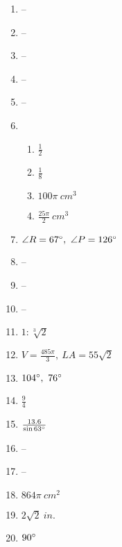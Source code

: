 \documentclass{article}
\begin{document}
\begin{enumerate}
\item -- 

\item --

\item --

\item --

\item --

\item 

	\begin{enumerate}
	
	\item $\frac{1}{2}$
	
	\item $\frac{1}{8}$
	
	\item $100 \pi \ cm^3$
	
	\item $\frac{25 \pi}{2} \ cm^3$
	
	\end{enumerate}
	
\item $\angle R = 67 \degree, \ \angle P = 126 \degree$

\item --

\item --

\item --

\item $1 : \sqrt[3]{2}$

\item $V = \frac{485 \pi}{3}, \ LA = 55 \sqrt{2}$

\item $104 \degree, \ 76 \degree$

\item $\frac{9}{4}$

\item $\frac{13.6}{\sin{63 \degree}}$

\item --

\item --

\item $864 \pi \ cm^2$

\item $2 \sqrt{2} \ in.$

\item $90 \degree$


\end{enumerate}
\end{document}

